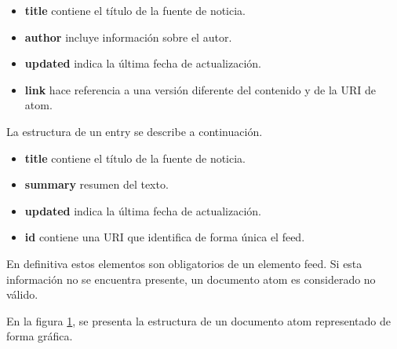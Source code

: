 \begin{itemize}

\item \textbf{title} contiene el título de la fuente de noticia.
\item \textbf{author} incluye información sobre el autor.
\item \textbf{updated} indica la última fecha de actualización.
\item \textbf{link} hace referencia a una versión diferente del contenido
y de la URI de atom.

\end{itemize}

La estructura de un entry se describe a continuación.

\begin{itemize}

\item \textbf{title} contiene el título de la fuente de noticia.
\item \textbf{summary} resumen del texto.
\item \textbf{updated} indica la última fecha de actualización.
\item \textbf{id} contiene una URI que identifica de forma única el feed.

\end{itemize}

En definitiva estos elementos son obligatorios de un elemento feed. Si esta
información no se encuentra presente, un documento atom es considerado no
válido. \cite{wittenbrink2005rss}

En la figura \ref{fig:Estructura de un documento Atom}, se presenta la
estructura de un documento atom representado de forma gráfica.

\begin{figure}[h!]
\centering
	\label{fig:Estructura de un documento Atom}
\end{figure}
